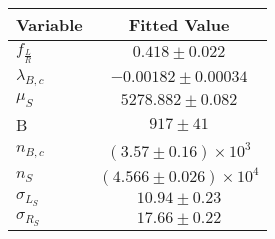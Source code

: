\begin{tabular}[t]{lc}
\hline
Variable &Fitted Value\\
\hline\hline
$f_{\frac{L}{R}}$&$0.418\pm0.022$\\
\hline
$\lambda_{B,c}$&$-0.00182\pm0.00034$\\
\hline
$\mu_S$&$5278.882\pm0.082$\\
\hline
B&$917\pm41$\\
\hline
$n_{B,c}$&$(3.57\pm0.16)\times 10^3$\\
\hline
$n_S$&$(4.566\pm0.026)\times 10^4$\\
\hline
$\sigma_{L_S}$&$10.94\pm0.23$\\
\hline
$\sigma_{R_S}$&$17.66\pm0.22$\\
\hline
\end{tabular}
